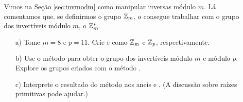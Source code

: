 \begin{exercise}
  Vimos na Seção \ref{sec:invmodm} como manipular inversas
  módulo $m$. Lá comentamos que, se definirmos o grupo
  $\mathbb{Z}_m$, o \sage consegue trabalhar com o grupo dos
  invertíveis módulo $m$, o $\mathbb{Z}_m^*$.
  \begin{itemize}
    \item[a)] Tome $m = 8$ e $p = 11$. Crie  e 
    como $\mathbb{Z}_m$ e $\mathbb{Z}_p$, respectivamente.
    \item[b)] Use o método  para obter o grupo
    dos invertíveis módulo $m$ e módulo $p$. Explore os
    grupos criados com o método .
    \item[c)] Interprete o resultado do método 
    nos aneis  e . (A discussão sobre raízes
    primitivas pode ajudar.)
  \end{itemize}
\end{exercise}